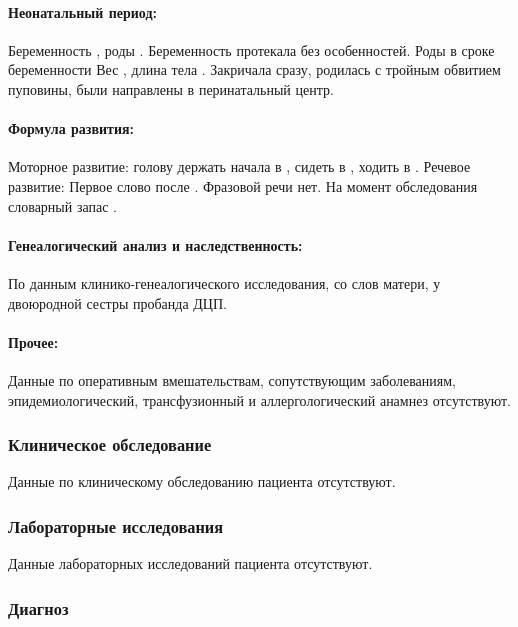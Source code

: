 \documentclass[a4paper,14pt]{extarticle}
\newcommand{\gramm}{г}
\newcommand{\cm}{см}
\newcommand{\months}{мес.}
\newcommand{\weeks}{нед.}
\begin{document}
\paragraph{Неонатальный период:} Беременность , роды .
Беременность протекала без особенностей. Роды в сроке беременности \numprint[\weeks]{41} Вес \numprint[\gramm]{3800}, длина тела \numprint[\cm]{54}. Закричала сразу, родилась с тройным обвитием пуповины, были направлены в перинатальный центр.

\paragraph{Формула развития:} Моторное развитие: голову держать начала в \numprint[\months]{3.5}, сидеть в \numprint[\months]{10}, ходить в .
Речевое развитие: Первое слово после . Фразовой речи нет. На момент обследования словарный запас .

\paragraph{Генеалогический анализ и наследственность:} По данным клинико\hyp{}генеалогического исследования, со слов матери, у двоюродной сестры пробанда ДЦП.

\paragraph{Прочее:} Данные по оперативным вмешательствам, сопутствующим заболеваниям, эпидемиологический, трансфузионный и аллергологический анамнез отсутствуют.

\subsubsection*{Клиническое обследование}

Данные по клиническому обследованию пациента отсутствуют.

\subsubsection*{Лабораторные исследования}

Данные лабораторных исследований пациента отсутствуют.

\subsubsection*{Диагноз}
\end{document}
